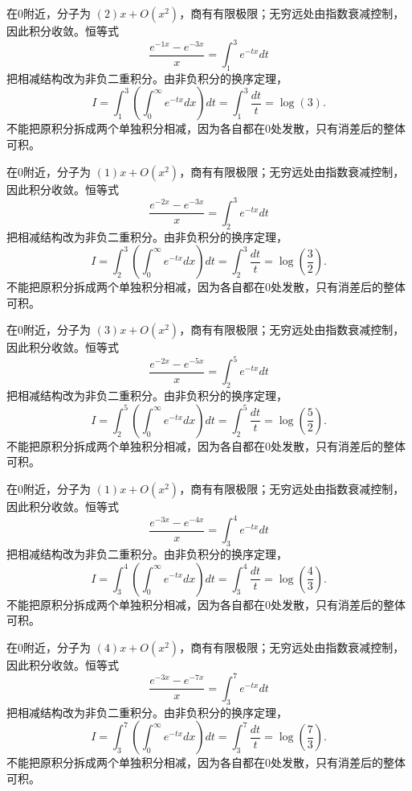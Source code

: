 \documentclass[UTF8,12pt,a4paper,fontset=fandol]{ctexart}
\begin{document}
\begin{solve}\label{ans:c20q14}
在0附近，分子为 $(2)x+O(x^2)$，商有有限极限；无穷远处由指数衰减控制，因此积分收敛。恒等式
\[
\frac{e^{-1x}-e^{-3x}}x=\int_{1}^{3}e^{-tx}dt
\]
把相减结构改为非负二重积分。由非负积分的换序定理，
\[
I=\int_{1}^{3}\left(\int_0^\infty e^{-tx}dx\right)dt=\int_{1}^{3}\frac{dt}t=\log(3).
\]
不能把原积分拆成两个单独积分相减，因为各自都在0处发散，只有消差后的整体可积。
\end{solve}

\begin{solve}\label{ans:c20q15}
在0附近，分子为 $(1)x+O(x^2)$，商有有限极限；无穷远处由指数衰减控制，因此积分收敛。恒等式
\[
\frac{e^{-2x}-e^{-3x}}x=\int_{2}^{3}e^{-tx}dt
\]
把相减结构改为非负二重积分。由非负积分的换序定理，
\[
I=\int_{2}^{3}\left(\int_0^\infty e^{-tx}dx\right)dt=\int_{2}^{3}\frac{dt}t=\log(\frac{3}{2}).
\]
不能把原积分拆成两个单独积分相减，因为各自都在0处发散，只有消差后的整体可积。
\end{solve}

\begin{solve}\label{ans:c20q16}
在0附近，分子为 $(3)x+O(x^2)$，商有有限极限；无穷远处由指数衰减控制，因此积分收敛。恒等式
\[
\frac{e^{-2x}-e^{-5x}}x=\int_{2}^{5}e^{-tx}dt
\]
把相减结构改为非负二重积分。由非负积分的换序定理，
\[
I=\int_{2}^{5}\left(\int_0^\infty e^{-tx}dx\right)dt=\int_{2}^{5}\frac{dt}t=\log(\frac{5}{2}).
\]
不能把原积分拆成两个单独积分相减，因为各自都在0处发散，只有消差后的整体可积。
\end{solve}

\begin{solve}\label{ans:c20q17}
在0附近，分子为 $(1)x+O(x^2)$，商有有限极限；无穷远处由指数衰减控制，因此积分收敛。恒等式
\[
\frac{e^{-3x}-e^{-4x}}x=\int_{3}^{4}e^{-tx}dt
\]
把相减结构改为非负二重积分。由非负积分的换序定理，
\[
I=\int_{3}^{4}\left(\int_0^\infty e^{-tx}dx\right)dt=\int_{3}^{4}\frac{dt}t=\log(\frac{4}{3}).
\]
不能把原积分拆成两个单独积分相减，因为各自都在0处发散，只有消差后的整体可积。
\end{solve}

\begin{solve}\label{ans:c20q18}
在0附近，分子为 $(4)x+O(x^2)$，商有有限极限；无穷远处由指数衰减控制，因此积分收敛。恒等式
\[
\frac{e^{-3x}-e^{-7x}}x=\int_{3}^{7}e^{-tx}dt
\]
把相减结构改为非负二重积分。由非负积分的换序定理，
\[
I=\int_{3}^{7}\left(\int_0^\infty e^{-tx}dx\right)dt=\int_{3}^{7}\frac{dt}t=\log(\frac{7}{3}).
\]
不能把原积分拆成两个单独积分相减，因为各自都在0处发散，只有消差后的整体可积。
\end{solve}
\end{document}
